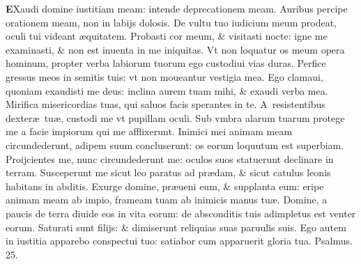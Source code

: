 \documentclass[a5paper,10pt]{book}
\def\ae{æ}
\begin{document}
\begin{multicols*}{2}
\vspace{-.5em}
\lettrine[lines=2]{\bfseries \color{red} E}{}Xaudi domine iustitiam meam: intende deprecationem meam.
\newline \color{red} A\color{black}uribus percipe orationem meam, non in labijs dolosis.
\newline \color{red} D\color{black}e vultu tuo iudicium meum prodeat, oculi tui videant \ae quitatem.%
\newline \color{red} P\color{black}robasti cor meum, \& visitasti nocte: igne me examinasti, \& non est inuenta in me iniquitas.
\newline \color{red} V\color{black}t non loquatur os meum opera hominum, propter verba labiorum tuorum ego custodiui vias duras.
\newline \color{red} P\color{black}erfice gressus meos in semitis tuis: vt non moueantur vestigia mea.
\newline \color{red} E\color{black}go clamaui, quoniam exaudisti me deus: inclina aurem tuam mihi, \& exaudi verba mea.
\newline \color{red} M\color{black}irifica misericordias tuas, qui saluos facis sperantes in te.
\newline \color{red} A\color{black}\ resistentibus dexter\ae \ tu\ae , custodi me vt pupillam oculi.
\newline \color{red} S\color{black}ub vmbra alarum tuarum protege me a facie impiorum qui me afflixerunt.
\newline \color{red} I\color{black}nimici mei animam meam circundederunt, adipem suum concluserunt: os eorum loquutum est superbiam.
\newline \color{red} P\color{black}roijcientes me, nunc circundederunt me: oculos suos statuerunt declinare in terram.
\newline \color{red} S\color{black}usceperunt me sicut leo paratus ad pr\ae dam, \& sicut catulus leonis habitans in abditis.
\newline \color{red} E\color{black}xurge domine, pr\ae ueni eum, \& supplanta eum: eripe animam meam ab impio, frameam tuam ab inimicis manus tu\ae .
\newline \color{red} D\color{black}omine, a paucis de terra diuide eos in vita eorum: de absconditis tuis adimpletus est venter eorum.
\newline \color{red} S\color{black}aturati sunt filijs: \& dimiserunt reliquias suas paruulis suis.
\newline \color{red} E\color{black}go autem in iustitia apparebo conspectui tuo: satiabor cum apparuerit gloria tua. \quad \color{red} Psalmus. \hypertarget{ps25}{25.} \color{black}

\end{multicols*}
\end{document}
